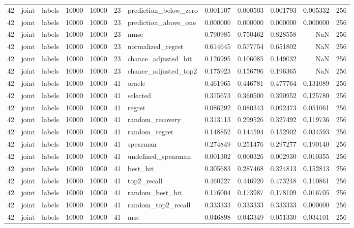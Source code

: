 \begin{tabular}{rllrrrlrrrrr}
42 & joint & labels & 10000 & 10000 & 23 & prediction_below_zero & 0.001107 & 0.000503 & 0.001793 & 0.005332 & 256 \\
42 & joint & labels & 10000 & 10000 & 23 & prediction_above_one & 0.000000 & 0.000000 & 0.000000 & 0.000000 & 256 \\
42 & joint & labels & 10000 & 10000 & 23 & nmse & 0.790985 & 0.750462 & 0.828558 & NaN & 256 \\
42 & joint & labels & 10000 & 10000 & 23 & normalized_regret & 0.614645 & 0.577754 & 0.651802 & NaN & 256 \\
42 & joint & labels & 10000 & 10000 & 23 & chance_adjusted_hit & 0.126995 & 0.106085 & 0.149032 & NaN & 256 \\
42 & joint & labels & 10000 & 10000 & 23 & chance_adjusted_top2 & 0.175923 & 0.156796 & 0.196365 & NaN & 256 \\
42 & joint & labels & 10000 & 10000 & 41 & oracle & 0.461965 & 0.446781 & 0.477764 & 0.131089 & 256 \\
42 & joint & labels & 10000 & 10000 & 41 & selected & 0.375673 & 0.360500 & 0.390952 & 0.125780 & 256 \\
42 & joint & labels & 10000 & 10000 & 41 & regret & 0.086292 & 0.080343 & 0.092473 & 0.051061 & 256 \\
42 & joint & labels & 10000 & 10000 & 41 & random_recovery & 0.313113 & 0.299526 & 0.327492 & 0.119736 & 256 \\
42 & joint & labels & 10000 & 10000 & 41 & random_regret & 0.148852 & 0.144594 & 0.152902 & 0.034593 & 256 \\
42 & joint & labels & 10000 & 10000 & 41 & spearman & 0.274849 & 0.251476 & 0.297277 & 0.190140 & 256 \\
42 & joint & labels & 10000 & 10000 & 41 & undefined_spearman & 0.001302 & 0.000326 & 0.002930 & 0.010355 & 256 \\
42 & joint & labels & 10000 & 10000 & 41 & best_hit & 0.305683 & 0.287468 & 0.324813 & 0.152813 & 256 \\
42 & joint & labels & 10000 & 10000 & 41 & top2_recall & 0.460227 & 0.446920 & 0.473248 & 0.110861 & 256 \\
42 & joint & labels & 10000 & 10000 & 41 & random_best_hit & 0.176004 & 0.173987 & 0.178109 & 0.016705 & 256 \\
42 & joint & labels & 10000 & 10000 & 41 & random_top2_recall & 0.333333 & 0.333333 & 0.333333 & 0.000000 & 256 \\
42 & joint & labels & 10000 & 10000 & 41 & mse & 0.046898 & 0.043349 & 0.051330 & 0.034101 & 256 \\

\end{tabular}
